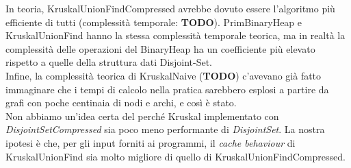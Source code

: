 \noindent In teoria, KruskalUnionFindCompressed avrebbe dovuto essere l'algoritmo più efficiente di tutti (complessità temporale: \textbf{TODO}).
\noindent PrimBinaryHeap e KruskalUnionFind hanno la stessa complessità temporale teorica, ma in realtà la complessità delle operazioni del BinaryHeap ha un coefficiente più elevato rispetto a quelle della struttura dati Disjoint-Set. \\

\noindent Infine, la complessità teorica di KruskalNaive (\textbf{TODO}) c'avevano già fatto immaginare che i tempi di calcolo nella pratica sarebbero esplosi a partire da grafi con poche centinaia di nodi e archi, e così è stato. \\

\noindent Non abbiamo un'idea certa del perché Kruskal implementato con \textit{DisjointSetCompressed} sia poco meno performante di \textit{DisjointSet}. La nostra ipotesi è che, per gli input forniti ai programmi, il \textit{cache behaviour} di KruskalUnionFind sia molto migliore di quello di KruskalUnionFindCompressed.
